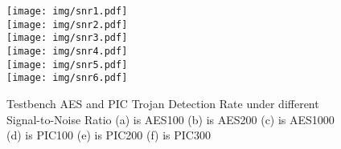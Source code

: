 \documentclass{beamer}
\begin{document}
\begin{columns}
\begin{column}[T]{0.33\textwidth}
                \begin{figure}[h]
                    \centering
                    \begin{columns}
                        \texttt{[image: img/snr1.pdf]}\\
                        \texttt{[image: img/snr2.pdf]}\\
                        \texttt{[image: img/snr3.pdf]}\\
                        \texttt{[image: img/snr4.pdf]}\\
                        \texttt{[image: img/snr5.pdf]}\\
                        \texttt{[image: img/snr6.pdf]}\\
                    \end{columns}
                    \label{fig:snr}
                    \caption{
                        {\color{black}Testbench AES and PIC Trojan Detection Rate under different
                    Signal-to-Noise Ratio
                    (a) is AES100
                    (b) is AES200
                    (c) is AES1000
                    (d) is PIC100
                    (e) is PIC200
                    (f) is PIC300}
                    }
                    \vspace{-0.15in}
                \end{figure}


\end{column}
\end{columns}
\end{document}
